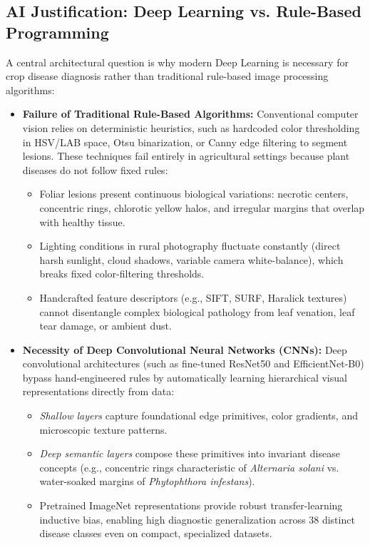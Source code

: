 \subsection{AI Justification: Deep Learning vs. Rule-Based Programming}
A central architectural question is why modern Deep Learning is necessary for crop disease diagnosis rather than traditional rule-based image processing algorithms:
\begin{itemize}
    \item \textbf{Failure of Traditional Rule-Based Algorithms:} Conventional computer vision relies on deterministic heuristics, such as hardcoded color thresholding in HSV/LAB space, Otsu binarization, or Canny edge filtering to segment lesions. These techniques fail entirely in agricultural settings because plant diseases do not follow fixed rules:
    \begin{itemize}
        \item Foliar lesions present continuous biological variations: necrotic centers, concentric rings, chlorotic yellow halos, and irregular margins that overlap with healthy tissue.
        \item Lighting conditions in rural photography fluctuate constantly (direct harsh sunlight, cloud shadows, variable camera white-balance), which breaks fixed color-filtering thresholds.
        \item Handcrafted feature descriptors (e.g., SIFT, SURF, Haralick textures) cannot disentangle complex biological pathology from leaf venation, leaf tear damage, or ambient dust.
    \end{itemize}
    \item \textbf{Necessity of Deep Convolutional Neural Networks (CNNs):} Deep convolutional architectures (such as fine-tuned ResNet50 and EfficientNet-B0) bypass hand-engineered rules by automatically learning hierarchical visual representations directly from data:
    \begin{itemize}
        \item \textit{Shallow layers} capture foundational edge primitives, color gradients, and microscopic texture patterns.
        \item \textit{Deep semantic layers} compose these primitives into invariant disease concepts (e.g., concentric rings characteristic of \textit{Alternaria solani} vs. water-soaked margins of \textit{Phytophthora infestans}).
        \item Pretrained ImageNet representations provide robust transfer-learning inductive bias, enabling high diagnostic generalization across 38 distinct disease classes even on compact, specialized datasets.
    \end{itemize}
\end{itemize}


